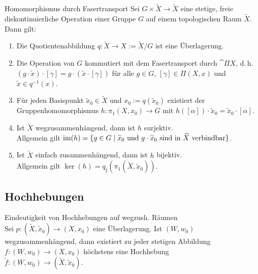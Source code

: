 \begin{Satz}{Homomorphismus durch Fasertransport}
    Sei $G \times \widetilde{X} \rightarrow \widetilde{X}$ eine stetige, freie
    diskontinuierliche Operation einer Gruppe $G$ auf einem topologischen Raum
    $\widetilde{X}$. Dann gilt:
    \begin{enumerate}
        \item
        Die Quotientenabbildung
        $q\colon \widetilde{X} \rightarrow X := \widetilde{X}/G$
        ist eine Überlagerung.

        \item
        Die Operation von $G$ kommutiert mit dem Fasertransport durch
        $\cat{\Pi X}$, d.\,h. \\
        $(g \cdot \widetilde{x}) \cdot [\gamma] =
        g \cdot (\widetilde{x} \cdot [\gamma])$
        für alle $g \in G$, $[\gamma] \in \Pi(X, x)$ und
        $\widetilde{x} \in q^{-1}(x)$.

        \item
        Für jeden Basispunkt $\widetilde{x}_0 \in \widetilde{X}$ und
        $x_0 := q(\widetilde{x}_0)$ existiert der Gruppenhomomorphismus
        $h\colon \pi_1(X, x_0) \rightarrow G$ mit
        $h([\alpha]) \cdot \widetilde{x}_0 = \widetilde{x}_0 \cdot [\alpha]$.

        \item
        Ist $\widetilde{X}$ wegzusammenhängend, dann ist $h$ surjektiv. \\
        Allgemein gilt $\text{im}(h) = \{g \in G \;|\; \widetilde{x}_0 \text{ und }
        g \cdot \widetilde{x}_0 \text{ sind in } \widetilde{X}
        \text{ verbindbar}\}$.

        \item
        Ist $\widetilde{X}$ einfach zusammenhängend, dann ist $h$ bijektiv. \\
        Allgemein gilt
        $\ker(h) = q_\sharp(\pi_1(\widetilde{X}, \widetilde{x}_0))$.
    \end{enumerate}
\end{Satz}

\pagebreak

\subsection{%
    Hochhebungen%
}

\begin{Satz}{Eindeutigkeit von Hochhebungen auf wegzush. Räumen}\\
    Sei $p\colon (\widetilde{X}, \widetilde{x}_0) \rightarrow (X, x_0)$
    eine Überlagerung.
    Ist $(W, w_0)$ wegzusammenhängend, dann existiert zu jeder stetigen
    Abbildung $f\colon (W, w_0) \rightarrow (X, x_0)$
    höchstens eine Hochhebung \\
    $\widetilde{f}\colon (W, w_0) \rightarrow
    (\widetilde{X}, \widetilde{x}_0)$.
\end{Satz}

